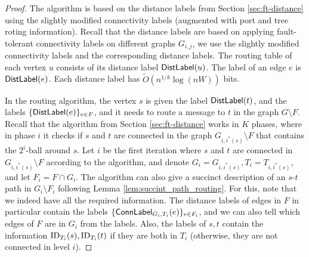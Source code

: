 \begin{proof}
The algorithm is based on the distance labels from Section \ref{sec:ft-distance} using the slightly modified connectivity labels (augmented with port and tree roting information). Recall that the distance labels are based on applying fault-tolerant connectivity labels on different graphs $G_{i,j}$, we use the slightly modified connectivity labels and the corresponding distance labels. 
The routing table of each vertex $u$ consists of its distance label $\mathsf{DistLabel}(u)$. The label of an edge $e$ is $\mathsf{DistLabel}(e)$. Each distance label has $\widetilde{O}(n^{1/k} \log(n W))$ bits. 

In the routing algorithm, the vertex $s$ is given the label $\mathsf{DistLabel}(t)$, and the labels $\{\mathsf{DistLabel}(e)\}_{e \in F}$, and it needs to route a message to $t$ in the graph $G \setminus F$. 
Recall that the algorithm from Section \ref{sec:ft-distance} works in $K$ phases, where in phase $i$ it checks if $s$ and $t$ are connected in the graph $G_{i,i^*(s)} \setminus F$ that contains the $2^i$-ball around $s$. Let $i$ be the first iteration where $s$ and $t$ are connected in $G_{i,i^*(s)} \setminus F$ according to the algorithm, and denote $G_i = G_{i,i^*(s)},T_i = T_{i,i^*(s)}$, and let $F_i = F \cap G_i$. The algorithm can also give a succinct description of an $s$-$t$ path in $G_i \setminus F_i$ following Lemma \ref{lem:succint_path_routing}. For this, note that we indeed have all the required information. The distance labels of edges in $F$ in particular contain the labels $\{\mathsf{ConnLabel}_{G_i,T_i}(e)\}_{e \in F_i}$, and we can also tell which edges of $F$ are in $G_i$ from the labels. Also, the labels of $s,t$ contain the information $\operatorname{ID}_{T_i}(s),\operatorname{ID}_{T_i}(t)$ if they are both in $T_i$ (otherwise, they are not connected in level $i$).


\end{proof}

